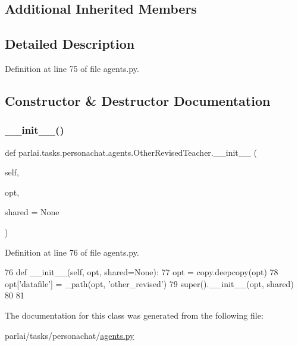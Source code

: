 \subsection*{Additional Inherited Members}


\subsection{Detailed Description}


Definition at line 75 of file agents.\+py.



\subsection{Constructor \& Destructor Documentation}
\mbox{\label{classparlai_1_1tasks_1_1personachat_1_1agents_1_1OtherRevisedTeacher_abb68640d48b19dae6529fb4e90decf78}} 
\subsubsection{\texorpdfstring{\+\_\+\+\_\+init\+\_\+\+\_\+()}{\_\_init\_\_()}}
{\footnotesize\ttfamily def parlai.\+tasks.\+personachat.\+agents.\+Other\+Revised\+Teacher.\+\_\+\+\_\+init\+\_\+\+\_\+ (\begin{DoxyParamCaption}\item[{}]{self,  }\item[{}]{opt,  }\item[{}]{shared = {\ttfamily None} }\end{DoxyParamCaption})}



Definition at line 76 of file agents.\+py.


\begin{DoxyCode}
76     \textcolor{keyword}{def }\_\_init\_\_(self, opt, shared=None):
77         opt = copy.deepcopy(opt)
78         opt[\textcolor{stringliteral}{'datafile'}] = \_path(opt, \textcolor{stringliteral}{'other\_revised'})
79         super().\_\_init\_\_(opt, shared)
80 
81 
\end{DoxyCode}


The documentation for this class was generated from the following file\+:\begin{DoxyCompactItemize}
\item 
parlai/tasks/personachat/\hyperlink{parlai_2tasks_2personachat_2agents_8py}{agents.\+py}\end{DoxyCompactItemize}
